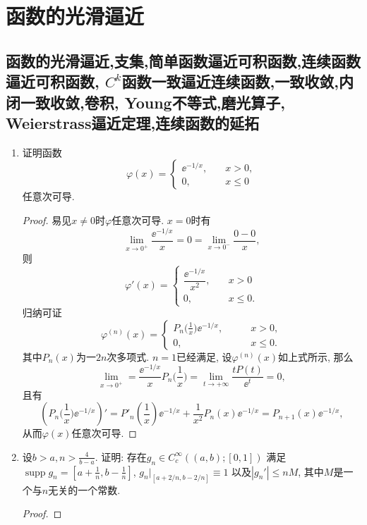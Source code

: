 \section{函数的光滑逼近}
\subsection{函数的光滑逼近,支集,简单函数逼近可积函数,连续函数逼近可积函数, \(C^k\)函数一致逼近连续函数,一致收敛,内闭一致收敛,卷积, Young不等式,磨光算子, Weierstrass逼近定理,连续函数的延拓}
\begin{quiza}
\begin{enumerate}
\item 证明函数\[\varphi(x)=\begin{cases}
\ee^{-1/x},\quad &x>0,\\
0,&x\leqslant 0
\end{cases}\]任意次可导.
\begin{proof}
易见\(x\ne 0\)时\(\varphi\)任意次可导. \(x=0\)时有
\[\lim_{x\rightarrow 0^+}\frac{\ee^{-1/x}}{x}=0
=\lim_{x\rightarrow 0^-}\frac{0-0}{x},\]
则\[\varphi'(x)=\begin{cases}
\dfrac{\ee^{-1/x}}{x^2},\quad&x>0\\
0,&x\leqslant 0.
\end{cases}\]归纳可证\[\varphi^{(n)}(x)=\begin{cases}
P_n\big(\frac{1}{x}\big)\ee^{-1/x},\qquad &x>0,\\
0,&x\leqslant 0.
\end{cases}\]其中\(P_n(x)\)为一\(2n\)次多项式. 
\(n=1\)已经满足, 设\(\varphi^{(n)}(x)\)如上式所示, 那么
\[\lim_{x\rightarrow 0^+}=\frac{\ee^{-1/x}}{x}P_n\Big(\frac{1}{x}\Big)
=\lim_{t\rightarrow+\infty}\frac{tP(t)}{\ee^t}=0,\]且有
\[\left(P_n\Big(\frac{1}{x}\Big)\ee^{-1/x}\right)'
=P'_n\left(\frac{1}{x}\right)\ee^{-1/x}+\frac{1}{x^2}P_n(x)\ee^{-1/x}
=P_{n+1}(x)\ee^{-1/x},\]从而\(\varphi(x)\)任意次可导.
\end{proof}

\item 设\(b>a,n>\frac{4}{b-a}\). 证明: 
存在\(g_n\in C_c^{\infty}((a,b);[0,1])\)
满足\(\operatorname{supp} g_n=\left[a+\frac{1}{n},b-\frac{1}{n}\right]\), 
\(g_n\big|_{\left[a+2/n,b-2/n\right]}\equiv 1\)
以及\(|g_n'|\leqslant nM\), 其中\(M\)是一个与\(n\)无关的一个常数.
\begin{proof}

\end{proof}


\end{enumerate}
\end{quiza}
